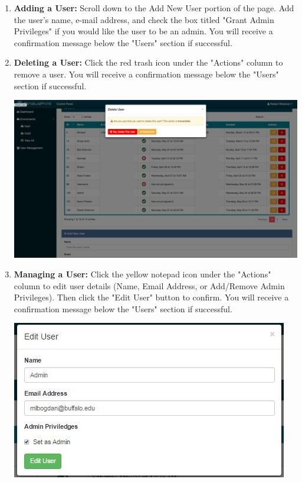     \begin{enumerate}
      \item \textbf{Adding a User:} Scroll down to the Add New User portion of the page.  Add the user's name,
      e-mail address, and check the box titled "Grant Admin Privileges" if you would like the user to be an
      admin.  You will receive a confirmation message below the "Users" section if successful.

      \item \textbf{Deleting a User:} Click the red trash icon under the "Actions" column to remove a user.
      You will receive a confirmation message below the "Users" section if successful.
      \begin{center}
        \includegraphics[scale=0.15]{images/delete_user_screenshot.png}
      \end{center}
      \item \textbf{Managing a User:} Click the yellow notepad icon under the "Actions" column to edit user
      details (Name, Email Address, or Add/Remove Admin Privileges).  Then click the "Edit User" button to confirm.
      You will receive a confirmation message below the "Users" section if successful.
      \begin{center}
        \includegraphics[scale=0.30]{images/user-edit.png}
    \end{center}
    \end{enumerate}

